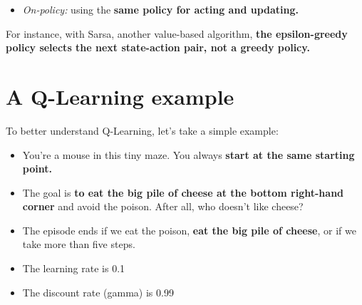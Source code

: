 \documentclass[11pt,a4paper]{article}
\begin{document}

\begin{itemize}
\tightlist
\item
  \emph{On-policy:} using the \textbf{same policy for acting and updating.}
\end{itemize}

For instance, with Sarsa, another value-based algorithm, \textbf{the epsilon-greedy policy selects the next state-action pair, not a greedy policy.}



\section{A Q-Learning example}\label{a-q-learning-example}

To better understand Q-Learning, let's take a simple example:


\begin{itemize}
\tightlist
\item
  You're a mouse in this tiny maze. You always \textbf{start at the same starting point.}
\item
  The goal is \textbf{to eat the big pile of cheese at the bottom right-hand corner} and avoid the poison. After all, who doesn't like cheese?
\item
  The episode ends if we eat the poison, \textbf{eat the big pile of cheese}, or if we take more than five steps.
\item
  The learning rate is 0.1
\item
  The discount rate (gamma) is 0.99
\end{itemize}
\end{document}
